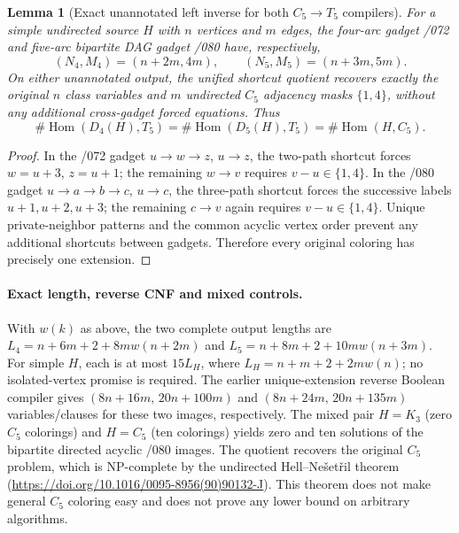 \documentclass[11pt]{article}
\newtheorem{lemma}{Lemma}
\begin{document}
\begin{lemma}[Exact unannotated left inverse for both $C_5\to T_5$ compilers]
For a simple undirected source $H$ with $n$ vertices and $m$ edges,
the four-arc gadget /072 and five-arc bipartite DAG gadget /080
have, respectively,
\[
(N_4,M_4)=(n+2m,4m),\qquad
(N_5,M_5)=(n+3m,5m).
\]
On either \emph{unannotated} output, the unified shortcut quotient
recovers exactly the original $n$ class variables and $m$
undirected $C_5$ adjacency masks $\{1,4\}$, without any additional
cross-gadget forced equations. Thus
\[
 \boxed{\#\operatorname{Hom}(D_4(H),T_5)=
        \#\operatorname{Hom}(D_5(H),T_5)=
        \#\operatorname{Hom}(H,C_5).}
\]
\end{lemma}
\begin{proof}
In the /072 gadget $u\to w\to z$, $u\to z$,
the two-path shortcut forces $w=u+3$, $z=u+1$;
the remaining $w\to v$ requires $v-u\in\{1,4\}$.
In the /080 gadget $u\to a\to b\to c$, $u\to c$,
the three-path shortcut forces the successive labels
$u+1,u+2,u+3$; the remaining $c\to v$
again requires $v-u\in\{1,4\}$.
Unique private-neighbor patterns and the common acyclic
vertex order prevent any additional shortcuts between gadgets.
Therefore every original coloring has precisely one extension.
\end{proof}

\paragraph{Exact length, reverse CNF and mixed controls.}
With $w(k)$ as above, the two complete output lengths are
$L_4=n+6m+2+8mw(n+2m)$ and
$L_5=n+8m+2+10mw(n+3m)$.
For simple $H$, each is at most $15L_H$, where
$L_H=n+m+2+2mw(n)$; no isolated-vertex promise is required.
The earlier unique-extension reverse Boolean compiler gives
$(8n+16m,\,20n+100m)$ and
$(8n+24m,\,20n+135m)$ variables/clauses for these two
images, respectively. The mixed pair $H=K_3$ (zero
$C_5$ colorings) and $H=C_5$ (ten colorings) yields zero
and ten solutions of the bipartite directed acyclic /080 images.
The quotient recovers the original $C_5$ problem, which is
NP-complete by the undirected Hell--Nešet\v{r}il theorem
(\url{https://doi.org/10.1016/0095-8956(90)90132-J}).
This theorem does not make general $C_5$ coloring easy and
does not prove any lower bound on arbitrary algorithms.
\end{document}
